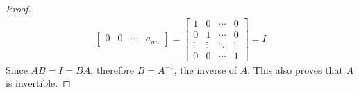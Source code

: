 \documentclass{article}
\begin{document}
\begin{question}{1.4}{}
\begin{proof}
\begin{align*}
\begin{bmatrix}
                            0      & 0      & \cdots & a_{nn}
                          \end{bmatrix} = \begin{bmatrix}
                                            1      & 0      & \cdots & 0      \\
                                            0      & 1      & \cdots & 0      \\
                                            \vdots & \vdots & \ddots & \vdots \\
                                            0      & 0      & \cdots & 1
                                          \end{bmatrix} = I
    \end{align*}
    Since $AB = I = BA$, therefore $B = A^{-1}$, the inverse of $A$. This also proves that $A$ is invertible.
  \end{proof}
\end{question}
\end{document}
